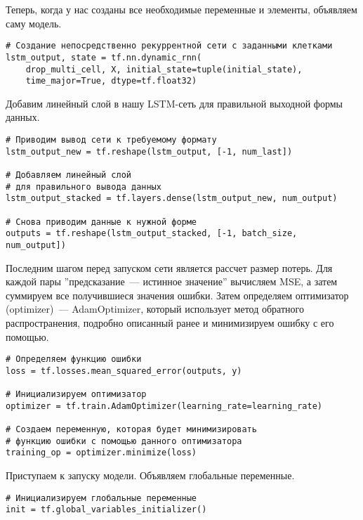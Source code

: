 \documentclass[12pt, a4paper]{article}
\begin{document}
Теперь, когда у нас созданы все необходимые переменные и элементы, объявляем саму модель.

\begin{verbatim}
# Создание непосредственно рекуррентной сети с заданными клетками
lstm_output, state = tf.nn.dynamic_rnn(
    drop_multi_cell, X, initial_state=tuple(initial_state),
    time_major=True, dtype=tf.float32)
\end{verbatim}

Добавим линейный слой в нашу LSTM-сеть для правильной выходной формы данных.

\begin{verbatim}
# Приводим вывод сети к требуемому формату
lstm_output_new = tf.reshape(lstm_output, [-1, num_last])

# Добавляем линейный слой
# для правильного вывода данных
lstm_output_stacked = tf.layers.dense(lstm_output_new, num_output)

# Снова приводим данные к нужной форме
outputs = tf.reshape(lstm_output_stacked, [-1, batch_size, num_output])
\end{verbatim}

Последним шагом перед запуском сети является рассчет размер потерь. Для каждой пары ''предсказание~---  истинное значение'' вычисляем MSE, а затем суммируем все получившиеся значения ошибки. Затем определяем оптимизатор (optimizer)~--- AdamOptimizer, который использует метод обратного распространения, подробно описанный ранее и минимизируем ошибку с его помощью.

\begin{verbatim}
# Определяем функцию ошибки
loss = tf.losses.mean_squared_error(outputs, y)

# Инициализируем оптимизатор
optimizer = tf.train.AdamOptimizer(learning_rate=learning_rate)

# Создаем переменную, которая будет минимизировать
# функцию ошибки с помощью данного оптимизатора
training_op = optimizer.minimize(loss)
\end{verbatim}

Приступаем к запуску модели. Объявляем глобальные переменные.

\begin{verbatim}
# Инициализируем глобальные переменные
init = tf.global_variables_initializer()
\end{verbatim}
\end{document}
